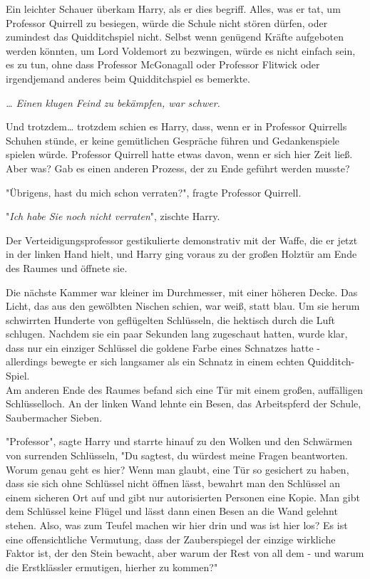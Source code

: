{Ein leichter Schauer überkam Harry, als er dies begriff. Alles, was er tat, um Professor Quirrell zu besiegen, würde die Schule nicht stören dürfen, oder zumindest das Quidditchspiel nicht. Selbst wenn genügend Kräfte aufgeboten werden könnten, um Lord Voldemort zu bezwingen, würde es nicht einfach sein, es zu tun, ohne dass Professor McGonagall oder Professor Flitwick oder irgendjemand anderes beim Quidditchspiel es bemerkte.

\emph{… Einen klugen Feind zu bekämpfen, war schwer.}

Und trotzdem… trotzdem schien es Harry, dass, wenn er in Professor Quirrells Schuhen stünde, er keine gemütlichen Gespräche führen und Gedankenspiele spielen würde. Professor Quirrell hatte etwas davon, wenn er sich hier Zeit ließ. Aber was? Gab es einen anderen Prozess, der zu Ende geführt werden musste?

"Übrigens, hast du mich schon verraten?", fragte Professor Quirrell.

"\emph{Ich habe Sie noch nicht verraten}", zischte Harry.

Der Verteidigungsprofessor gestikulierte demonstrativ mit der Waffe, die er jetzt in der linken Hand hielt, und Harry ging voraus zu der großen Holztür am Ende des Raumes und öffnete sie.

Die nächste Kammer war kleiner im Durchmesser, mit einer höheren Decke. Das Licht, das aus den gewölbten Nischen schien, war weiß, statt blau. Um sie herum schwirrten Hunderte von geflügelten Schlüsseln, die hektisch durch die Luft schlugen. Nachdem sie ein paar Sekunden lang zugeschaut hatten, wurde klar, dass nur ein einziger Schlüssel die goldene Farbe eines Schnatzes hatte - allerdings bewegte er sich langsamer als ein Schnatz in einem echten Quidditch-Spiel.\\ Am anderen Ende des Raumes befand sich eine Tür mit einem großen, auffälligen Schlüsselloch. An der linken Wand lehnte ein Besen, das Arbeitspferd der Schule, Saubermacher Sieben.

"Professor", sagte Harry und starrte hinauf zu den Wolken und den Schwärmen von surrenden Schlüsseln, "Du sagtest, du würdest meine Fragen beantworten. Worum genau geht es hier? Wenn man glaubt, eine Tür so gesichert zu haben, dass sie sich ohne Schlüssel nicht öffnen lässt, bewahrt man den Schlüssel an einem sicheren Ort auf und gibt nur autorisierten Personen eine Kopie. Man gibt dem Schlüssel keine Flügel und lässt dann einen Besen an die Wand gelehnt stehen. Also, was zum Teufel machen wir hier drin und was ist hier los? Es ist eine offensichtliche Vermutung, dass der Zauberspiegel der einzige wirkliche Faktor ist, der den Stein bewacht, aber warum der Rest von all dem - und warum die Erstklässler ermutigen, hierher zu kommen?"

}

